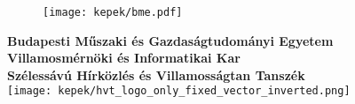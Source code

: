 \begin{titlepage}

\begin{figure}
	\centering
	\texttt{[image: kepek/bme.pdf]}
\end{figure}
%
\centering
\textbf{Budapesti Műszaki és Gazdaságtudományi Egyetem}\\
\textbf{Villamosmérnöki és Informatikai Kar}\\
\textbf{Szélessávú Hírközlés és Villamosságtan Tanszék}\\
\vspace{5mm}
\texttt{[image: kepek/hvt\_logo\_only\_fixed\_vector\_inverted.png]}  \\

\vspace{40mm}
\Huge
\dokumentumcim\\
\vspace{6mm}%

\Large
\thetitle \\
\vspace{6mm}

\Large
\textbf{\theauthor}\\ %
\vspace{30mm}



\centering
\the\year %


\end{titlepage}